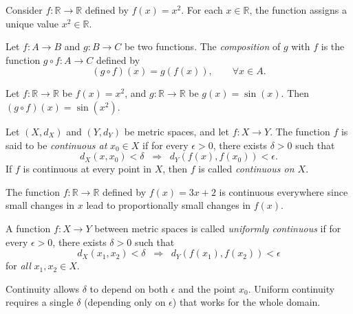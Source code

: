 \begin{example}
Consider $f:\mathbb{R} \to \mathbb{R}$ defined by $f(x) = x^2$.  
For each $x \in \mathbb{R}$, the function assigns a unique value $x^2 \in \mathbb{R}$.  
\end{example}

\begin{definition}
Let $f:A \to B$ and $g:B \to C$ be two functions.  
The \emph{composition} of $g$ with $f$ is the function $g \circ f : A \to C$ defined by
\[
(g \circ f)(x) = g(f(x)), \qquad \forall x \in A.
\]
\end{definition}

\begin{example}
Let $f:\mathbb{R}\to \mathbb{R}$ be $f(x)=x^2$, and $g:\mathbb{R}\to \mathbb{R}$ be $g(x)=\sin(x)$.  
Then $(g \circ f)(x) = \sin(x^2)$.  
\end{example}

\begin{definition}
Let $(X,d_X)$ and $(Y,d_Y)$ be metric spaces, and let $f:X \to Y$.  
The function $f$ is said to be \emph{continuous at} $x_0 \in X$ if for every $\epsilon > 0$, there exists $\delta > 0$ such that
\[
d_X(x,x_0) < \delta \;\;\Rightarrow\;\; d_Y(f(x), f(x_0)) < \epsilon.
\]
If $f$ is continuous at every point in $X$, then $f$ is called \emph{continuous on $X$}.  
\end{definition}

\begin{example}
The function $f:\mathbb{R}\to \mathbb{R}$ defined by $f(x) = 3x+2$ is continuous everywhere since small changes in $x$ lead to proportionally small changes in $f(x)$.  
\end{example}

\begin{definition}
A function $f:X \to Y$ between metric spaces is called \emph{uniformly continuous} if for every $\epsilon > 0$, there exists $\delta > 0$ such that
\[
d_X(x_1,x_2) < \delta \;\;\Rightarrow\;\; d_Y(f(x_1), f(x_2)) < \epsilon
\]
for \emph{all} $x_1, x_2 \in X$.  
\end{definition}

\begin{remark}
Continuity allows $\delta$ to depend on both $\epsilon$ and the point $x_0$.  
Uniform continuity requires a single $\delta$ (depending only on $\epsilon$) that works for the whole domain.  
\end{remark}


